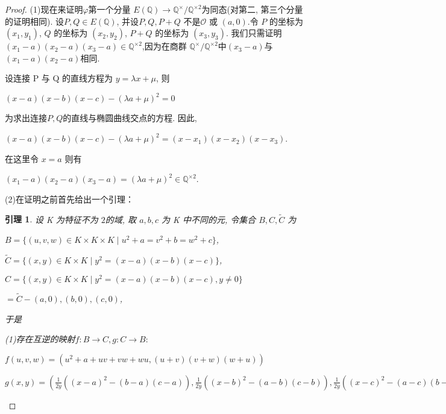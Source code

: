 \documentclass[11pt]{ctexart}
\newtheorem{lem}{引理}[section]
\begin{document}
\begin{proof}
(1)现在来证明$\varphi$第一个分量 $E(\mathbb{Q})\rightarrow\mathbb{Q}^{\times }/\mathbb{Q}^{\times 2}$为同态(对第二, 第三个分量的证明相同).
设$ P, Q \in E(\mathbb{Q})$, 并设$ P, Q, P +Q$ 不是$ \mathcal{O}$ 或 $(a, 0)$.令 $P$
的坐标为$ (x_1, y_1)$,  $Q$ 的坐标为 $(x_2, y_2)$, $P + Q$ 的坐标为 $(x_3, y_3)$. 我们只需证明
$(x_1 - a)(x_2 - a)(x_3 - a) \in \mathbb{Q}^{\times 2}$,因为在商群 $\mathbb{Q}^{\times }/\mathbb{Q}^{\times 2}$中$ (x_3 - a) $与$ (x_1 - a)(x_2 - a) $相同.

\noindent
设连接 P 与 Q 的直线方程为 $y = \lambda x + \mu$, 则
\begin{center}
    $(x - a)(x -b)(x - c) - (\lambda a + \mu)^2= 0$
\end{center}


\noindent
为求出连接$P,Q$的直线与椭圆曲线交点的方程. 因此,
\begin{center}
$(x - a)(x - b)(x- c) - (\lambda a + \mu)^2 = (x - x_1)(x - x_2)(x - x_3)$.
\end{center}

\noindent
在这里令 $x = a$ 则有
\begin{center}
$(x_1 - a)(x_2 - a)(x_3 - a) = (\lambda a + \mu)^2 \in \mathbb{Q}^{\times 2}$. 
\end{center}

(2)在证明之前首先给出一个引理：


\begin{lem}

设 K 为特征不为 $2 $的域, 取 $a, b, c$ 为 K 中不同的元, 令集合 $B, C, \widetilde{C}$
为

\begin{center}

$B = \{(u, v, w) \in K \times K \times  K\mid u^2 + a = v^2 + b = w^2 + c\}$,

$\widetilde{C}=\{{(x, y)\in K \times K\mid y^2 = (x-a)(x-b)(x-c)}\}$,

$C=\{{(x, y)\in K \times K \mid y^2 = (x-a)(x-b)(x-c),y\neq 0}\}$

$=\widetilde{C}-{(a,0),(b,0),(c,0)}$,

\end{center}
  

\noindent
于是

(1)存在互逆的映射$f:B \rightarrow C ,g:C \rightarrow B:$

\begin{center}
    $f(u, v, w) = (u^2 + a + uv + vw + wu,(u + v)(v + w)(w + u))$

    $g(x, y) = (\frac{1}{2y}((x - a)^2- (b -a)(c -a)),\frac{1}{2y}((x - b)^2- (a - b)(c - b)),\frac{1}{2y}((x - c)^2- (a - c)(b - c)))$
\end{center}


\end{lem}
\end{proof}
\end{document}
